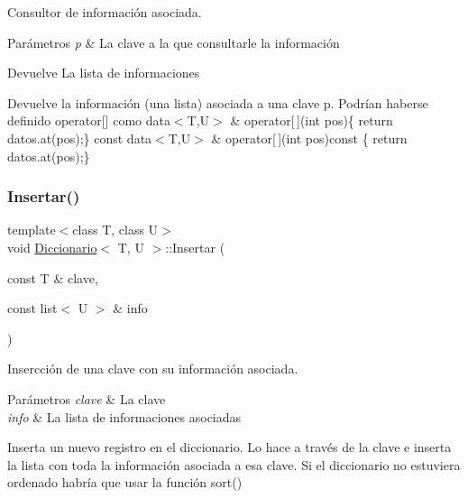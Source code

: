 Consultor de información asociada. 


\begin{DoxyParams}{Parámetros}
{\em p} & La clave a la que consultarle la información \\
\hline
\end{DoxyParams}
\begin{DoxyReturn}{Devuelve}
La lista de informaciones
\end{DoxyReturn}
Devuelve la información (una lista) asociada a una clave p. Podrían haberse definido operator\mbox{[}\mbox{]} como data$<$\+T,\+U$>$ \& operator\mbox{[}$\,$\mbox{]}(int pos)\{ return datos.\+at(pos);\} const data$<$\+T,\+U$>$ \& operator\mbox{[}$\,$\mbox{]}(int pos)const \{ return datos.\+at(pos);\} \mbox{\label{classDiccionario_af520b73907852cc8002260ddf9fb822c}} 
\subsubsection{\texorpdfstring{Insertar()}{Insertar()}}
{\footnotesize\ttfamily template$<$class T, class U$>$ \\
void \hyperlink{classDiccionario}{Diccionario}$<$ T, U $>$\+::Insertar (\begin{DoxyParamCaption}\item[{const T \&}]{clave,  }\item[{const list$<$ U $>$ \&}]{info }\end{DoxyParamCaption})\hspace{0.3cm}{\ttfamily [inline]}}



Insercción de una clave con su información asociada. 


\begin{DoxyParams}{Parámetros}
{\em clave} & La clave \\
\hline
{\em info} & La lista de informaciones asociadas\\
\hline
\end{DoxyParams}
Inserta un nuevo registro en el diccionario. Lo hace a través de la clave e inserta la lista con toda la información asociada a esa clave. Si el diccionario no estuviera ordenado habría que usar la función sort() \mbox{\label{classDiccionario_a5fa4a649047e6d270132bf0448a05915}} 
